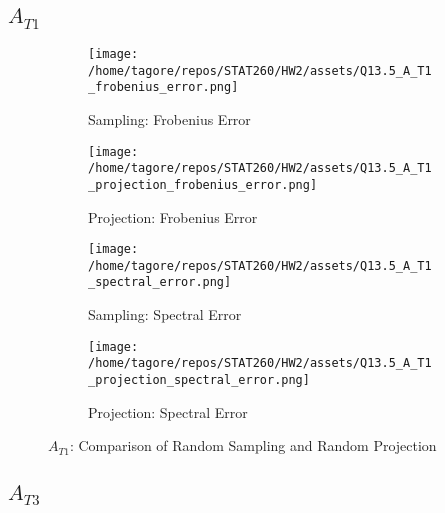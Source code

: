 \documentclass{article}
\begin{document}
\newpage
\subsection*{\(A_{T1}\)}

\begin{figure}[H]
    \centering
    \begin{subfigure}[b]{0.48\textwidth}
        \centering
        \texttt{[image: /home/tagore/repos/STAT260/HW2/assets/Q13.5\_A\_T1\_frobenius\_error.png]}
        \caption{Sampling: Frobenius Error}
        \label{fig:T1_fs}
    \end{subfigure}
    \hfill
    \begin{subfigure}[b]{0.48\textwidth}
        \centering
        \texttt{[image: /home/tagore/repos/STAT260/HW2/assets/Q13.5\_A\_T1\_projection\_frobenius\_error.png]}
        \caption{Projection: Frobenius Error}
        \label{fig:T1_fp}
    \end{subfigure}
    
    \vspace{0.5cm}
    
    \begin{subfigure}[b]{0.48\textwidth}
        \centering
        \texttt{[image: /home/tagore/repos/STAT260/HW2/assets/Q13.5\_A\_T1\_spectral\_error.png]}
        \caption{Sampling: Spectral Error}
        \label{fig:T1_ss}
    \end{subfigure}
    \hfill
    \begin{subfigure}[b]{0.48\textwidth}
        \centering
        \texttt{[image: /home/tagore/repos/STAT260/HW2/assets/Q13.5\_A\_T1\_projection\_spectral\_error.png]}
        \caption{Projection: Spectral Error}
        \label{fig:T1_sp}
    \end{subfigure}
    
    \caption{\(A_{T1}\): Comparison of Random Sampling and Random Projection}
    \label{fig:T1_comparison}
\end{figure}

\newpage
\subsection*{\(A_{T3}\)}
\end{document}
